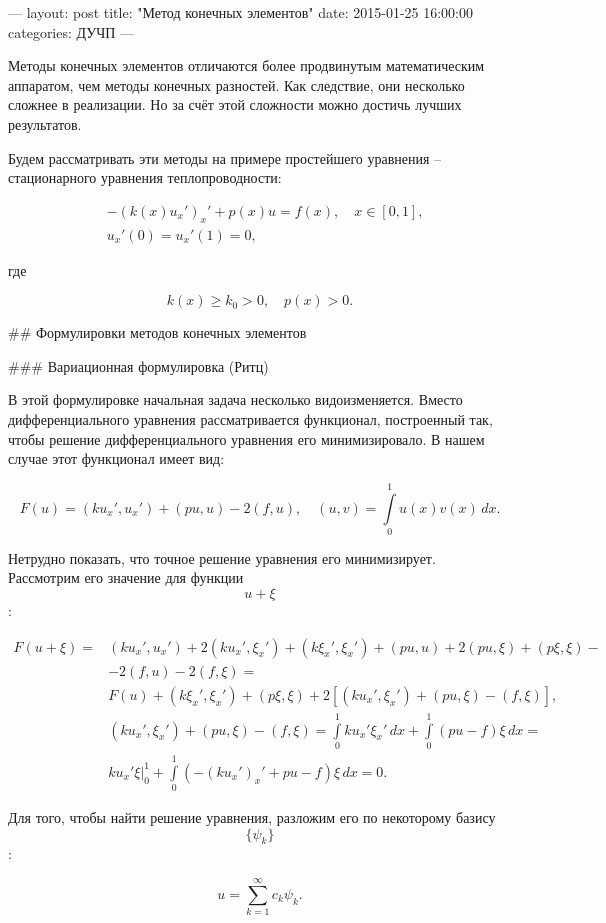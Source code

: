 ---
layout: post
title:  "Метод конечных элементов"
date:   2015-01-25 16:00:00
categories: ДУЧП
---

Методы конечных элементов отличаются более продвинутым математическим аппаратом, чем методы конечных разностей. Как следствие, они несколько сложнее в реализации. Но за счёт этой сложности можно достичь лучших результатов.

Будем рассматривать эти методы на примере простейшего уравнения -- стационарного уравнения теплопроводности:

$$
\begin{aligned}
  & -(k(x) u_x')_x' + p(x)u = f(x),\quad x\in[0,1],\\
  & u_x'(0) = u_x'(1) = 0,
\end{aligned}
$$

где

$$
  k(x) \ge k_0 > 0,\quad p(x) > 0.
$$

## Формулировки методов конечных элементов

### Вариационная формулировка (Ритц)

В этой формулировке начальная задача несколько видоизменяется. Вместо дифференциального уравнения рассматривается функционал, построенный так, чтобы решение дифференциального уравнения его минимизировало. В нашем случае этот функционал имеет вид:

$$
  F(u) = (k u_x', u_x') + (p u, u) - 2 (f, u),\quad (u, v) = \int\limits_0^1 u(x) v(x)\,dx.
$$

Нетрудно показать, что точное решение уравнения его минимизирует. Рассмотрим его значение для функции $$ u + \xi $$:

$$
\begin{aligned}
  F(u + \xi) = & (k u_x', u_x') + 2 (k u_x', \xi_x') + (k \xi_x', \xi_x') + (p u, u) + 2 (p u, \xi) + (p \xi, \xi) -\\
  & - 2 (f, u) - 2 (f, \xi) =\\
  & F(u) + (k \xi_x', \xi_x') + (p \xi, \xi) + 2[(ku_x', \xi_x') + (pu, \xi) - (f, \xi)],\\
  & (ku_x', \xi_x') + (pu, \xi) - (f, \xi) = \int\limits_0^1 ku_x'\xi_x'\,dx + \int\limits_0^1 (pu - f)\xi\,dx = \\
  & ku_x'\xi\Big|_0^1 + \int\limits_0^1 (-(ku_x')_x' + pu - f)\xi\,dx = 0.
\end{aligned}
$$

Для того, чтобы найти решение уравнения, разложим его по некоторому базису $$ \{ \psi_k \} $$:

$$
  u = \sum\limits_{k=1}^\infty c_k \psi_k.
$$

